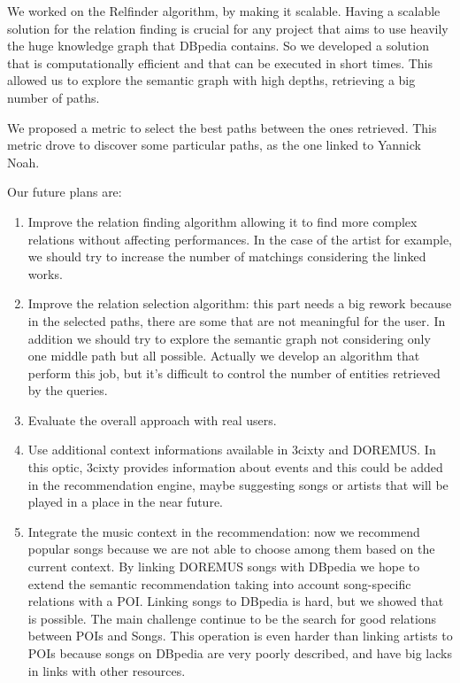 \documentclass[paper=a4, fontsize=11pt]{scrartcl}
\begin{document}
We worked on the Relfinder algorithm, by making it scalable. Having a scalable solution for the relation finding is crucial for any project that aims to use heavily the huge knowledge graph that DBpedia contains. So we developed a solution that is computationally efficient and that can be executed in short times. This allowed us to explore the semantic graph with high depths, retrieving a big number of paths.

We proposed a metric to select the best paths between the ones retrieved. This metric drove to discover some particular paths, as the one linked to Yannick Noah.

Our future plans are:
\begin{enumerate}
\item Improve the relation finding algorithm allowing it to find more complex relations without affecting performances. In the case of the artist for example, we should try to increase the number of matchings considering the linked works. 
\item Improve the relation selection algorithm: this part needs a big rework because in the selected paths, there are some that are not meaningful for the user. In addition we should try to explore the semantic graph not considering only one middle path but all possible. Actually we develop an algorithm that perform this job, but it's difficult to control the number of entities retrieved by the queries. 
\item Evaluate the overall approach with real users.
\item Use additional context informations available in 3cixty and DOREMUS. In this optic, 3cixty provides information about events and this could be added in the recommendation engine, maybe suggesting songs or artists that will be played in a place in the near future.
\item Integrate the music context in the recommendation: now we recommend popular songs because we are not able to choose among them based on the current context. By linking DOREMUS songs with DBpedia we hope to extend the semantic recommendation taking into account song-specific relations with a POI. Linking songs to DBpedia is hard, but we showed that is possible. The main challenge continue to be the search for good relations between POIs and Songs. This operation is even harder than linking artists to POIs because songs on DBpedia are very poorly described, and have big lacks in links with other resources.
\end{enumerate}


\end{document}
